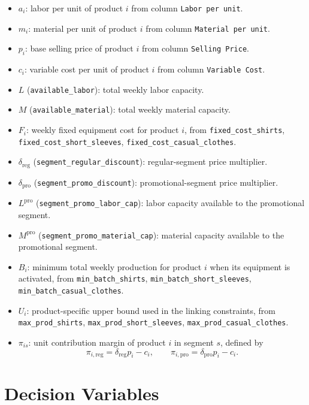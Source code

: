 \begin{itemize}
    \item $a_i$: labor per unit of product $i$ from column \texttt{Labor per unit}.
    \item $m_i$: material per unit of product $i$ from column \texttt{Material per unit}.
    \item $p_i$: base selling price of product $i$ from column \texttt{Selling Price}.
    \item $c_i$: variable cost per unit of product $i$ from column \texttt{Variable Cost}.
    \item $L$ (\texttt{available\_labor}): total weekly labor capacity.
    \item $M$ (\texttt{available\_material}): total weekly material capacity.
    \item $F_i$: weekly fixed equipment cost for product $i$, from
    \texttt{fixed\_cost\_shirts},
    \texttt{fixed\_cost\_short\_sleeves},
    \texttt{fixed\_cost\_casual\_clothes}.
    \item $\delta_{\mathrm{reg}}$ (\texttt{segment\_regular\_discount}): regular-segment price multiplier.
    \item $\delta_{\mathrm{pro}}$ (\texttt{segment\_promo\_discount}): promotional-segment price multiplier.
    \item $L^{\mathrm{pro}}$ (\texttt{segment\_promo\_labor\_cap}): labor capacity available to the promotional segment.
    \item $M^{\mathrm{pro}}$ (\texttt{segment\_promo\_material\_cap}): material capacity available to the promotional segment.
    \item $B_i$: minimum total weekly production for product $i$ when its equipment is activated, from
    \texttt{min\_batch\_shirts},
    \texttt{min\_batch\_short\_sleeves},
    \texttt{min\_batch\_casual\_clothes}.
    \item $U_i$: product-specific upper bound used in the linking constraints, from
    \texttt{max\_prod\_shirts},
    \texttt{max\_prod\_short\_sleeves},
    \texttt{max\_prod\_casual\_clothes}.
    \item $\pi_{is}$: unit contribution margin of product $i$ in segment $s$, defined by
    \[
    \pi_{i,\mathrm{reg}}=\delta_{\mathrm{reg}}p_i-c_i,
    \qquad
    \pi_{i,\mathrm{pro}}=\delta_{\mathrm{pro}}p_i-c_i.
    \]
\end{itemize}

\section*{Decision Variables}

